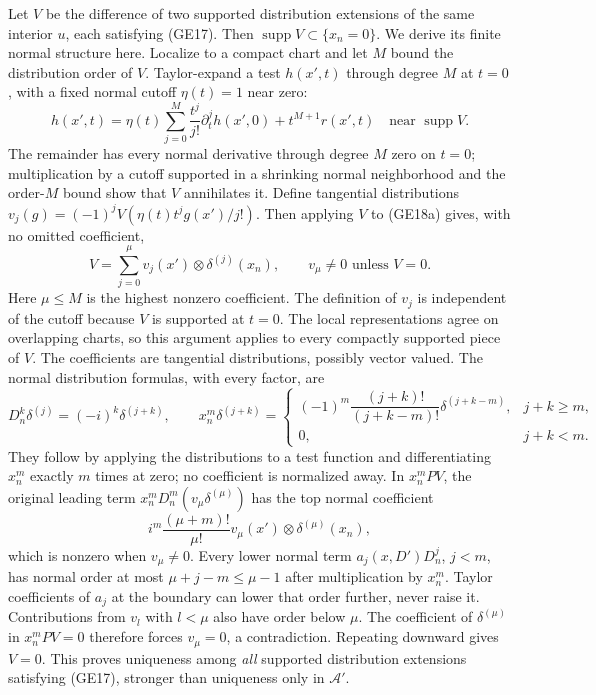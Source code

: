 \documentclass[
  11pt,
]{article}
\begin{document}
Let \(V\) be the difference of two supported distribution extensions of
the same interior \(u\), each satisfying (GE17). Then
\(\operatorname{supp}V\subset\{x_n=0\}\). We derive its finite normal
structure here. Localize to a compact chart and let \(M\) bound the
distribution order of \(V\). Taylor-expand a test \(h(x',t)\) through
degree \(M\) at \(t=0\), with a fixed normal cutoff \(\eta(t)=1\) near
zero: \[
 h(x',t)=\eta(t)\sum_{j=0}^{M}
       \frac{t^j}{j!}\partial_t^jh(x',0)+t^{M+1}r(x',t)
 \quad\text{near }\operatorname{supp}V.
 \tag{GE18a}
\] The remainder has every normal derivative through degree \(M\) zero
on \(t=0\); multiplication by a cutoff supported in a shrinking normal
neighborhood and the order-\(M\) bound show that \(V\) annihilates it.
Define tangential distributions \(v_j(g)=(-1)^jV(\eta(t)t^jg(x')/j!)\).
Then applying \(V\) to (GE18a) gives, with no omitted coefficient, \[
 V=\sum_{j=0}^{\mu}v_j(x')\otimes\delta^{(j)}(x_n),
 \qquad v_\mu\ne0\text{ unless }V=0.
 \tag{GE18}
\] Here \(\mu\le M\) is the highest nonzero coefficient. The definition
of \(v_j\) is independent of the cutoff because \(V\) is supported at
\(t=0\). The local representations agree on overlapping charts, so this
argument applies to every compactly supported piece of \(V\). The
coefficients are tangential distributions, possibly vector valued. The
normal distribution formulas, with every factor, are \[
 D_n^k\delta^{(j)}=(-i)^k\delta^{(j+k)},\qquad
 x_n^m\delta^{(j+k)}
 =\begin{cases}
 (-1)^m\dfrac{(j+k)!}{(j+k-m)!}\delta^{(j+k-m)},&j+k\ge m,\\
 0,&j+k<m.
 \end{cases}
 \tag{GE19}
\] They follow by applying the distributions to a test function and
differentiating \(x_n^m\) exactly \(m\) times at zero; no coefficient is
normalized away. In \(x_n^mPV\), the original leading term
\(x_n^mD_n^m(v_\mu\delta^{(\mu)})\) has the top normal coefficient \[
 i^m\frac{(\mu+m)!}{\mu!}
       v_\mu(x')\otimes\delta^{(\mu)}(x_n),
 \tag{GE20}
\] which is nonzero when \(v_\mu\ne0\). Every lower normal term
\(a_j(x,D')D_n^j\), \(j<m\), has normal order at most
\(\mu+j-m\le\mu-1\) after multiplication by \(x_n^m\). Taylor
coefficients of \(a_j\) at the boundary can lower that order further,
never raise it. Contributions from \(v_l\) with \(l<\mu\) also have
order below \(\mu\). The coefficient of \(\delta^{(\mu)}\) in
\(x_n^mPV=0\) therefore forces \(v_\mu=0\), a contradiction. Repeating
downward gives \(V=0\). This proves uniqueness among \emph{all}
supported distribution extensions satisfying (GE17), stronger than
uniqueness only in \(\mathcal A'\).
\end{document}
